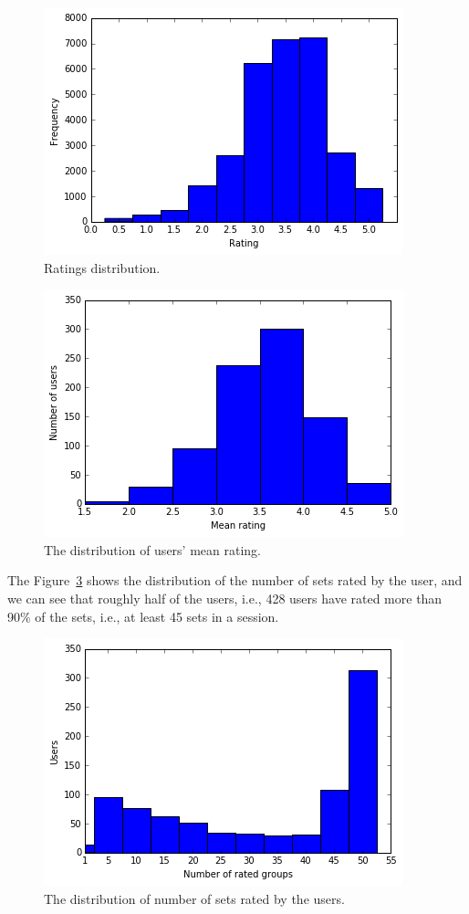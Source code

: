\begin{figure}[ht]
  \includegraphics[scale=0.65]{figures/setratingdist.png}
  \caption{Ratings distribution.}
  \label{fig:setratingdist}
\end{figure}

\begin{figure}[ht]
  \includegraphics[scale=0.65]{figures/meanratingdist.png}
  \caption{The distribution of users' mean rating.}
  \label{fig:meanratingdist}
\end{figure}



The Figure~\ref{fig:usersetdist} shows the distribution of the number of sets rated by the user,
and we can see that roughly half of the users, i.e., 428 users have rated more
than 90\% of the sets, i.e., at least 45 sets in a session.

\begin{figure}[ht]
  \includegraphics[scale=0.65]{figures/usersetdist.png}
  \caption{The distribution of number of sets rated by the users.}
  \label{fig:usersetdist}
\end{figure}

